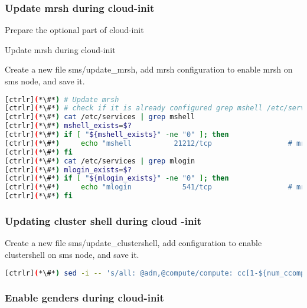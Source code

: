 \subsubsection{Update mrsh during cloud-init}

	Prepare the optional part of cloud-init

	Update mrsh during cloud-init 
 
	Create a new file sms/update\_mrsh, add mrsh configuration to enable mrsh on sms node, and save it. 


\begin{lstlisting}[language=bash,keywords={}]
[ctrlr](*\#*) # Update mrsh
[ctrlr](*\#*) # check if it is already configured grep mshell /etc/services will return non-zero, else configure"
[ctrlr](*\#*) cat /etc/services | grep mshell
[ctrlr](*\#*) mshell_exists=$?
[ctrlr](*\#*) if [ "${mshell_exists}" -ne "0" ]; then
[ctrlr](*\#*)     echo "mshell          21212/tcp                  # mrshd" >> /etc/services
[ctrlr](*\#*) fi
[ctrlr](*\#*) cat /etc/services | grep mlogin
[ctrlr](*\#*) mlogin_exists=$?
[ctrlr](*\#*) if [ "${mlogin_exists}" -ne "0" ]; then
[ctrlr](*\#*)     echo "mlogin            541/tcp                  # mrlogind" >> /etc/services
[ctrlr](*\#*) fi
\end{lstlisting} 


\subsubsection{Updating cluster shell during cloud -init}
	
	Create a new file sms/update\_clustershell, add configuration to enable clustershell on sms node, and save it. 


\begin{lstlisting}[language=bash,keywords={}]
[ctrlr](*\#*) sed -i -- 's/all: @adm,@compute/compute: cc[1-${num_ccomputes}]\n&/' /etc/clustershell/groups.d/local.cfg
\end{lstlisting} 
 
 \subsubsection{Enable genders during cloud-init}
	

